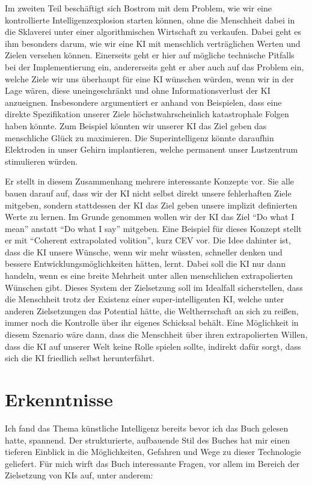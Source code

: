 \documentclass[twoside, a4paper, DIV=11, open=any, bibliography=totoc]{scrbook}
\begin{document}
Im zweiten Teil beschäftigt sich Bostrom mit dem Problem, wie wir eine kontrollierte
Intelligenzexplosion starten können, ohne die Menschheit dabei in die Sklaverei
unter einer algorithmischen Wirtschaft zu verkaufen. Dabei geht es ihm besonders
darum, wie wir eine KI mit menschlich verträglichen Werten und Zielen versehen können.
Einerseits geht er hier auf mögliche technische Pitfalls bei der Implementierung ein,
andererseits geht er aber auch auf das Problem ein, welche Ziele wir uns überhaupt
für eine KI wünschen würden, wenn wir in der Lage wären, diese uneingeschränkt und
ohne Informationsverlust der KI anzueignen.
Insbesondere argumentiert er anhand von Beispielen, dass eine direkte Spezifikation
unserer Ziele höchstwahrscheinlich katastrophale Folgen haben könnte.
Zum Beispiel könnten wir unserer KI das Ziel geben das menschliche Glück zu maximieren.
Die Superintelligenz könnte daraufhin Elektroden in unser Gehirn implantieren, welche
permanent unser Lustzentrum stimulieren würden.

Er stellt in diesem Zusammenhang mehrere interessante Konzepte vor.
Sie alle bauen darauf auf, dass wir der KI nicht selbst direkt unsere fehlerhaften
Ziele mitgeben, sondern stattdessen der KI das Ziel geben unsere implizit definierten
Werte zu lernen. Im Grunde genommen wollen wir der KI das Ziel \enquote{Do what I mean}
anstatt \enquote{Do what I say} mitgeben.
Eine Beispiel für dieses Konzept stellt er mit \enquote{Coherent extrapolated volition},
kurz CEV vor. Die Idee dahinter ist, dass die KI unsere Wünsche, wenn wir mehr wüssten,
schneller denken und bessere Entwicklungsmöglichkeiten hätten, lernt.
Dabei soll die KI nur dann handeln, wenn es eine breite Mehrheit unter allen
menschlichen extrapolierten Wünschen gibt.
Dieses System der Zielsetzung soll im Idealfall sicherstellen, dass die Menschheit
trotz der Existenz einer super-intelligenten KI, welche unter anderen Zielsetzungen
das Potential hätte, die Weltherrschaft an sich zu reißen, immer noch die Kontrolle
über ihr eigenes Schicksal behält.
Eine Möglichkeit in diesem Szenario wäre dann, dass die Menschheit über ihren
extrapolierten Willen, dass die KI auf unserer Welt keine Rolle spielen sollte,
indirekt dafür sorgt, dass sich die KI friedlich selbst herunterfährt.

\section{Erkenntnisse} \label{sec:literkenntnis}

Ich fand das Thema künstliche Intelligenz bereits bevor ich das Buch gelesen hatte, spannend.
Der strukturierte, aufbauende Stil des Buches hat mir einen tieferen Einblick in
die Möglichkeiten, Gefahren und Wege zu dieser Technologie geliefert.
Für mich wirft das Buch interessante Fragen, vor allem im Bereich der Zielsetzung von KIs auf,
unter anderem:
\end{document}

